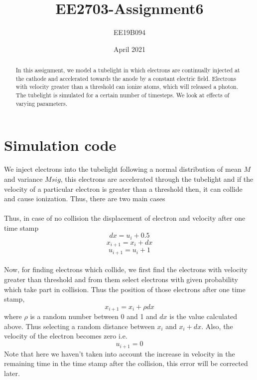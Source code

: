 \documentclass[11pt, a4paper]{article}
\title{EE2703-Assignment6}
\author{EE19B094}
\date{April 2021}
\begin{document}
\maketitle
\newpage

\begin{abstract}
    In this assignment, we model a tubelight in which electrons are continually injected at the cathode and accelerated towards the anode by a constant electric field. Electrons with velocity greater than a threshold can ionize atoms, which will released a photon. The tubelight is simulated for a certain number of timesteps. We look at effects of varying parameters.
\end{abstract}

\section{Simulation code}
We inject electrons into the tubelight following a normal distribution of mean $M$ and variance $Msig$, this electrons are accelerated through the tubelight and if the velocity of a particular electron is greater than a threshold then, it can collide and cause ionization. Thus, there are two main cases\\\\
Thus, in case of no collision the displacement of electron and velocity after one time stamp
\[
dx = u_i + 0.5
\]
\[
x_{i+1} = x_i + dx
\]
\[
u_{i+1} = u_i + 1
\]\\

Now, for finding electrons which collide, we first find the electrons with velocity greater than threshold and from them select electrons with given probability which take part in collision. Thus the position of those electrons after one time stamp,
\[
x_{i+1} = x_i + \rho dx
\]
where $\rho$ is a random number between 0 and 1 and $dx$ is the value calculated above. Thus selecting a random distance between $x_i$ and $x_i + dx$. Also, the velocity of the electron becomes zero i.e. $$u_{i+1} = 0$$ Note that here we haven't taken into account the increase in velocity in the remaining time in the time stamp after the collision, this error will be corrected later.
\end{document}

